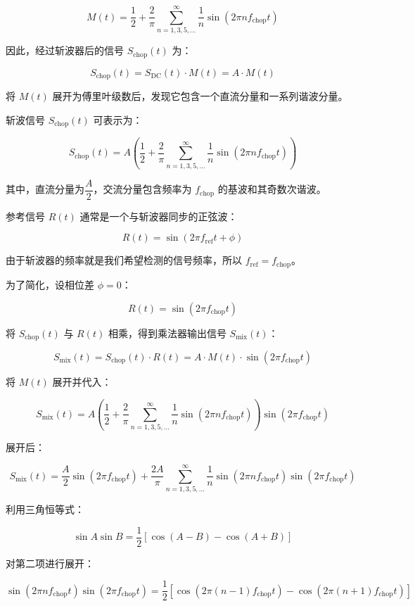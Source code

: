 \[
M(t) = \dfrac{1}{2} + \dfrac{2}{\pi} \sum_{n=1,3,5,\dots}^{\infty} \dfrac{1}{n} \sin(2\pi n f_{\text{chop}} t)
\]

因此，经过斩波器后的信号 \( S_{\text{chop}}(t) \) 为：

\[
S_{\text{chop}}(t) = S_{\text{DC}}(t) \cdot M(t) = A \cdot M(t)
\]

将 \( M(t) \) 展开为傅里叶级数后，发现它包含一个直流分量和一系列谐波分量。

斩波信号 \( S_{\text{chop}}(t) \) 可表示为：

\[
S_{\text{chop}}(t) = A \left( \dfrac{1}{2} + \dfrac{2}{\pi} \sum_{n=1,3,5,\dots}^{\infty} \dfrac{1}{n} \sin(2\pi n f_{\text{chop}} t) \right)
\]

其中，直流分量为\( \dfrac{A}{2} \)，交流分量包含频率为 \( f_{\text{chop}} \) 的基波和其奇数次谐波。

参考信号 \( R(t) \) 通常是一个与斩波器同步的正弦波：

\[
R(t) = \sin(2\pi f_{\text{ref}} t + \phi)
\]

由于斩波器的频率就是我们希望检测的信号频率，所以 \( f_{\text{ref}} = f_{\text{chop}} \)。

为了简化，设相位差 \( \phi = 0 \)：

\[
R(t) = \sin(2\pi f_{\text{chop}} t)
\]

将 \( S_{\text{chop}}(t) \) 与 \( R(t) \) 相乘，得到乘法器输出信号 \( S_{\text{mix}}(t) \)：

\[
S_{\text{mix}}(t) = S_{\text{chop}}(t) \cdot R(t) = A \cdot M(t) \cdot \sin(2\pi f_{\text{chop}} t)
\]

将 \( M(t) \) 展开并代入：

\[
S_{\text{mix}}(t) = A \left( \dfrac{1}{2} + \dfrac{2}{\pi} \sum_{n=1,3,5,\dots}^{\infty} \dfrac{1}{n} \sin(2\pi n f_{\text{chop}} t) \right) \sin(2\pi f_{\text{chop}} t)
\]

展开后：

\[
S_{\text{mix}}(t) = \dfrac{A}{2} \sin(2\pi f_{\text{chop}} t) + \dfrac{2A}{\pi} \sum_{n=1,3,5,\dots}^{\infty} \dfrac{1}{n} \sin(2\pi n f_{\text{chop}} t) \sin(2\pi f_{\text{chop}} t)
\]

利用三角恒等式：

\[
\sin A \sin B = \dfrac{1}{2} [\cos(A - B) - \cos(A + B)]
\]

对第二项进行展开：

\[
\sin(2\pi n f_{\text{chop}} t) \sin(2\pi f_{\text{chop}} t) = \dfrac{1}{2} \left[ \cos(2\pi (n - 1) f_{\text{chop}} t) - \cos(2\pi (n + 1) f_{\text{chop}} t) \right]
\]

